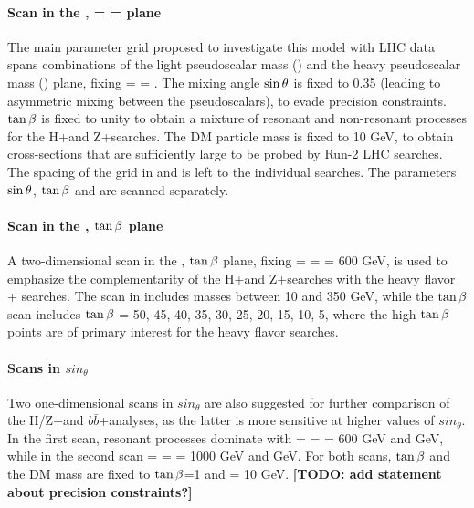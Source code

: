 \paragraph{Scan in the \ma, \mA = \mH = \mHc plane}

The main parameter grid proposed to investigate this model with LHC data spans combinations of the light pseudoscalar mass (\ma) and the heavy pseudoscalar mass (\mA) plane, fixing \mA = \mH = \mHc. The mixing angle $\sin\theta$ is fixed to 0.35 (leading to asymmetric mixing between the pseudoscalars), to evade precision constraints. $\tan\beta$ is fixed to unity to obtain a mixture of resonant and non-resonant processes for the H+\MET and Z+\MET searches. The DM particle mass is fixed to 10 GeV, to obtain cross-sections that are sufficiently large to be probed by Run-2 LHC searches. The spacing of the grid in \ma and \mA is left to the individual searches. The parameters $\sin\theta$, $\tan\beta$ and \mDM are scanned separately.

\paragraph{Scan in the \ma, $\tan\beta$ plane}

A two-dimensional scan in the \ma, $\tan\beta$ plane, fixing \mA = \mH = \mHc = 600 GeV, is used to emphasize the complementarity of the H+\MET and Z+\MET searches with the heavy flavor + \MET searches. The scan in \ma includes masses between 10 and 350 GeV, while the $\tan\beta$ scan includes $\tan\beta$ = 50, 45, 40, 35, 30, 25, 20, 15, 10, 5, where the high-$\tan\beta$ points are of primary interest for the heavy flavor searches. 

\paragraph{Scans in $sin_{\theta}$}

Two one-dimensional scans in $sin_{\theta}$ are also suggested for further comparison of the H/Z+\MET and $b\bar{b}$+\MET analyses, as the latter is more sensitive at higher values of $sin_{\theta}$. In the first scan, resonant processes dominate with \mA = \mH = \mHc = 600 GeV and  GeV, while in the second scan \mA = \mH = \mHc = 1000 GeV and  GeV. For both scans, $\tan\beta$ and the DM mass are fixed to $\tan\beta$=1 and \mDM = 10 GeV. \textbf{[TODO: add statement about precision constraints?]}

